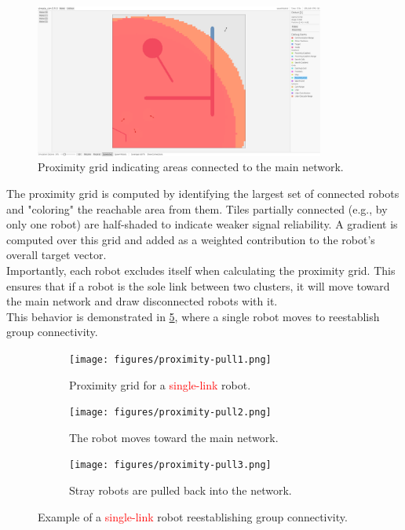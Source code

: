 \begin{figure}[h]
    \begin{center}
        \includegraphics[width=0.85\textwidth]{figures/screenshots/proximity-gradient.png}
    \end{center}
    \caption{Proximity grid indicating areas connected to the main network.}
    \label{fig:proximity-grid}
\end{figure}

The proximity grid is computed by identifying the largest set of connected robots and "coloring" the reachable area from them. Tiles partially connected (e.g., by only one robot) are half-shaded to indicate weaker signal reliability. A gradient is computed over this grid and added as a weighted contribution to the robot’s overall target vector. \\

Importantly, each robot excludes itself when calculating the proximity grid. This ensures that if a robot is the sole link between two clusters, it will move toward the main network and draw disconnected robots with it. \\

This behavior is demonstrated in \cref{fig:proximity-pull}, where a single robot moves to reestablish group connectivity.

\def\w{0.329\textwidth}
\begin{figure}[h]
    \begin{center}
        \begin{subfigure}[b]{\w}
            \centering
            \texttt{[image: figures/proximity-pull1.png]}
            \caption{Proximity grid for a \textcolor{red}{single-link} robot.}
            \label{fig:proximity-pull1}
        \end{subfigure}
        \begin{subfigure}[b]{\w}
            \centering
            \texttt{[image: figures/proximity-pull2.png]}
            \caption{The robot moves toward the main network.}
            \label{fig:proximity-pull2}
        \end{subfigure}
        \begin{subfigure}[b]{\w}
            \centering
            \texttt{[image: figures/proximity-pull3.png]}
            \caption{Stray robots are pulled back into the network.}
            \label{fig:proximity-pull3}
        \end{subfigure}
    \end{center}
    \caption{Example of a \textcolor{red}{single-link} robot reestablishing group connectivity.}
    \label{fig:proximity-pull}
\end{figure}


